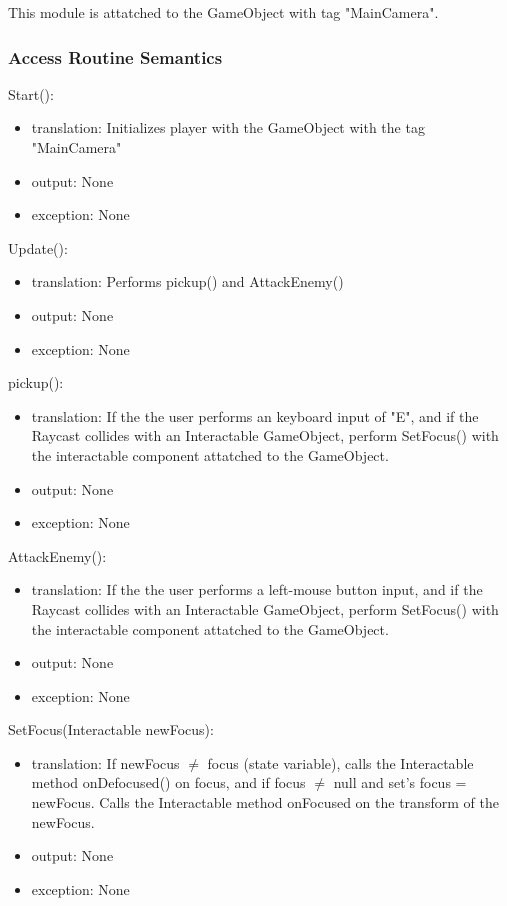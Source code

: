 \documentclass[12pt]{article}
\begin{document}
This module is attatched to the GameObject with tag "MainCamera". 

\subsubsection* {Access Routine Semantics}

\noindent Start():
\begin{itemize}
\item translation: Initializes player with the GameObject with the tag "MainCamera"
\item output: None
\item exception: None
\end{itemize}

\noindent Update():
\begin{itemize}
\item translation: Performs pickup() and AttackEnemy()
\item output: None
\item exception: None
\end{itemize}

\noindent pickup():
\begin{itemize}
\item translation: If the the user performs an keyboard input of "E", and if the Raycast collides with an Interactable GameObject, perform SetFocus() with the interactable component attatched to the GameObject.
\item output: None
\item exception: None
\end{itemize}

\noindent AttackEnemy():
\begin{itemize}
\item translation: If the the user performs a left-mouse button input, and if the Raycast collides with an Interactable GameObject, perform SetFocus() with the interactable component attatched to the GameObject.
\item output: None
\item exception: None
\end{itemize}

\noindent SetFocus(Interactable newFocus):
\begin{itemize}
\item translation: If newFocus $\neq$ focus (state variable), calls the Interactable method onDefocused() on focus, and if focus $\neq$ null and set's focus = newFocus. Calls the Interactable method onFocused on the transform of the newFocus.
\item output: None
\item exception: None
\end{itemize}
\end{document}
